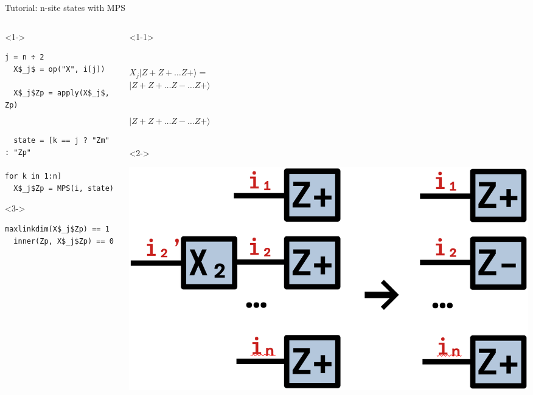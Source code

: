 \begin{frame}[fragile]{Tutorial: n-site states with MPS}

\begin{columns}

\begin{column}{6cm}

\begin{onlyenv}<1->
\begin{lstlisting}[language=JuliaLocal, style=julia, mathescape, basicstyle=\scriptsize\ttfamily]
  j = n ÷ 2
  X$_j$ = op("X", i[j])

  X$_j$Zp = apply(X$_j$, Zp)


  state = [k == j ? "Zm" : "Zp"
                           for k in 1:n]
  X$_j$Zp = MPS(i, state)
\end{lstlisting}
\end{onlyenv}

\begin{onlyenv}<3->
\begin{lstlisting}[language=JuliaLocal, style=julia, mathescape, basicstyle=\scriptsize\ttfamily]
  maxlinkdim(X$_j$Zp) == 1
  inner(Zp, X$_j$Zp) == 0
\end{lstlisting}
\end{onlyenv}

\end{column}

\begin{column}{4.5cm}

\begin{onlyenv}<1-1>
~\\
~\\
~\\
$X_j|Z+Z+\dots Z+\rangle =$ \\
$|Z+Z+\dots Z-\dots Z+\rangle$ \\
~\\
~\\
$|Z+Z+\dots Z-\dots Z+\rangle$ \\
~\\
\end{onlyenv}

\begin{onlyenv}<2->
\vspace*{0.0cm}
\begin{center}
\includegraphics[width=1.0\textwidth]{
  slides/assets/XjZpn.png
}
\end{center}
\vspace*{0.0cm}
\end{onlyenv}


\end{column}
\end{columns}
\end{frame}

